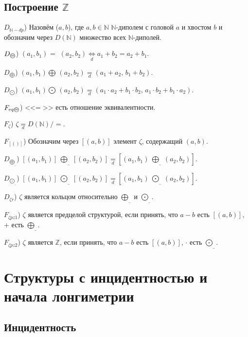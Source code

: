 \documentclass[a4paper]{article}
\newcommand{\Def}[0]{\underset{d}{\Leftrightarrow}}
\begin{document}
\subsection{Построение $\mathbb{Z}$}

$D_{\mathbb{N}-dp}$) Назовём ($a,b$), где $a, b \in \mathbb{N}$  $\mathbb{N}$-диполем с головой $a$ и хвостом $b$ и обозначим через $D(\mathbb{N})$ множество всех $\mathbb{N}$-диполей.

$D_{\text{\textcircled{=}}}$) $(a_1, b_1)$ \textcircled{=} $(a_2, b_2) \Def a_1 + b_2 = a_2 + b_1.$

$D_{\bigoplus}$) $(a_1, b_1) \bigoplus \, (a_2, b_2) \underset{d}{=} (a_1 + a_2, \, b_1 + b_2).$

$D_{\bigodot}$) $(a_1, b_1) \bigodot \, (a_2, b_2) \underset{d}{=} (a_1 \cdot a_2 + b_1 \cdot b_2, \, a_1 \cdot b_2 + b_1 \cdot a_2).$

$F_{eq \text{\textcircled{=}}}$) <<\textcircled{=}>> есть отношение эквивалентности.

$F_{\zeta}$) $\zeta \underset{d}{=} D(\mathbb{N}) /$ \textcircled{=}.

$F_{[()]}$) Обозначим через $[(a, b)]$ элемент $\zeta$, содержащий $(a, b)$.

$D_{\underline{\bigoplus}}$)  $[(a_1, b_1)] \: \underline{\bigoplus} \: [(a_2, b_2)] \underset{d}{=} [(a_1, b_1) \: \underline{\bigoplus} \: (a_2, b_2)].$

$D_{\underline{\bigodot}}$)  $[(a_1, b_1)] \: \underline{\bigodot} \: [(a_2, b_2)] \underset{d}{=} [(a_1, b_1) \: \underline{\bigodot} \: (a_2, b_2)].$

$D_{\zeta r}$) $\zeta$ является кольцом относительно $\underline{\bigoplus}$ и $\underline{\bigodot}$.

$F_{\zeta p z1}$) $\zeta$ является предцелой структурой, если принять, что $a-b$ есть $[(a, b)]$, $+$ есть $\underline{\bigoplus}$.

$F_{\zeta p z2}$) $\zeta$ является $\mathbb{Z}$, если принять, что $a-b$ есть $[(a, b)]$, $\cdot$ есть $\underline{\bigodot}$.


\section{Структуры с инцидентностью и начала лонгиметрии}

\subsection{Инцидентность}
\end{document}
